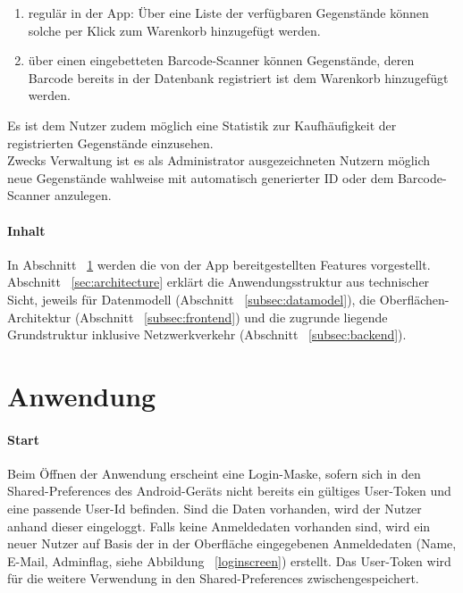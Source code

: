 \documentclass{scrartcl}
\begin{document}
	\begin{enumerate}
		\item regulär in der App: Über eine Liste der verfügbaren Gegenstände können solche per Klick zum Warenkorb hinzugefügt werden.

		\item über einen eingebetteten Barcode-Scanner können Gegenstände, deren Barcode bereits in der Datenbank registriert ist dem Warenkorb hinzugefügt werden.
	\end{enumerate}

	Es ist dem Nutzer zudem möglich eine Statistik zur Kaufhäufigkeit der registrierten Gegenstände einzusehen. \\
	Zwecks Verwaltung ist es als Administrator ausgezeichneten Nutzern möglich neue Gegenstände wahlweise mit automatisch generierter ID oder dem Barcode-Scanner anzulegen.

	\paragraph*{Inhalt}
	In Abschnitt ~\ref{sec:features} werden die von der App bereitgestellten Features vorgestellt.
	Abschnitt ~\ref{sec:architecture} erklärt die Anwendungsstruktur aus technischer Sicht, jeweils für Datenmodell (Abschnitt ~\ref{subsec:datamodel}), die Oberflächen-Architektur (Abschnitt ~\ref{subsec:frontend}) und die zugrunde liegende Grundstruktur inklusive Netzwerkverkehr (Abschnitt ~\ref{subsec:backend}).


	\section{Anwendung}\label{sec:features}
	\paragraph*{Start}
	Beim Öffnen der Anwendung erscheint eine Login-Maske, sofern sich in den Shared-Preferences des Android-Geräts nicht bereits ein gültiges User-Token und eine passende User-Id befinden.
	Sind die Daten vorhanden, wird der Nutzer anhand dieser eingeloggt.
	Falls keine Anmeldedaten vorhanden sind, wird ein neuer Nutzer auf Basis der in der Oberfläche eingegebenen Anmeldedaten (Name, E-Mail, Adminflag, siehe Abbildung ~\ref{loginscreen}) erstellt.
	Das User-Token wird für die weitere Verwendung in den Shared-Preferences zwischengespeichert.
\end{document}

